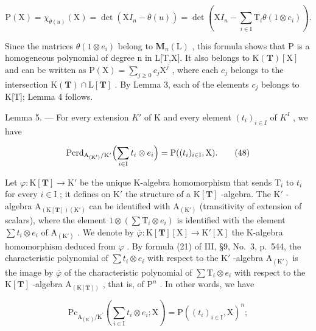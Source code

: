 \[
\mathrm{P} (\mathrm{X}) = \chi_ {\overline {{\theta}} (u)} (\mathrm{X}) = \det (\mathrm{X} I _ {n} - \overline {{\theta}} (u)) = \det \left(\mathrm{X} I _ {n} - \sum_ {i \in \mathrm{I}} \mathrm{T} _ {i} \theta (1 \otimes e _ {i})\right).\tag{47}
\]

Since the matrices \(\theta(1\otimes e_{i})\) belong to \(\mathbf{M}_{n}(\mathrm{L})\) , this formula shows that P is a homogeneous polynomial of degree n in L{[}T,X{]}. It also belongs to \(\mathrm{K}(\mathbf{T})[\mathrm{X}]\) and can be written as \(\mathrm{P}(\mathrm{X})=\sum_{j\geqslant0}c_{j}\mathrm{X}^{j}\) , where each \(c_{j}\) belongs to the intersection \(\mathrm{K}(\mathbf{T})\cap\mathrm{L}[\mathbf{T}]\) . By Lemma 3, each of the elements \(c_{j}\) belongs to K{[}T{]}; Lemma 4 follows.

Lemma 5. --- For every extension \(K'\) of K and every element \((t_{i})_{i\in I}\) of \(K^{I}\) , we have

\[
\mathrm{Pcrd} _ {\mathrm{A} _ {(\mathrm{K} ^ {\prime})} / \mathrm{K} ^ {\prime}} \Bigl (\sum_ {i \in \mathrm{I}} t _ {i} \otimes e _ {i} \Bigr) = \mathrm{P} ((t _ {i}) _ {i \in \mathrm{I}}, \mathrm{X}).\tag{48}
\]

Let \(\varphi : \mathrm{K}[\mathbf{T}] \to \mathrm{K}'\) be the unique K-algebra homomorphism that sends \(\mathrm{T}_i\) to \(t_i\) for every \(i \in \mathrm{I}\) ; it defines on \(\mathrm{K}'\) the structure of a \(\mathrm{K}[\mathbf{T}]\) -algebra. The \(\mathrm{K}'\) -algebra \(\mathrm{A}_{(\mathrm{K}[\mathbf{T}])(\mathrm{K}')}\) can be identified with \(\mathrm{A}_{(\mathrm{K}')}\) (transitivity of extension of scalars), where the element \(1 \otimes (\sum \mathrm{T}_i \otimes e_i)\) is identified with the element \(\sum t_i \otimes e_i\) of \(\mathrm{A}_{(\mathrm{K}')}\) . We denote by \(\overline{\varphi}: \mathrm{K}[\mathbf{T}][\mathrm{X}] \to \mathrm{K}'[\mathrm{X}]\) the K-algebra homomorphism deduced from \(\varphi\) . By formula (21) of III, §9, No.~3, p.~544, the characteristic polynomial of \(\sum t_i \otimes e_i\) with respect to the \(\mathrm{K}'\) -algebra \(\mathrm{A}_{(\mathrm{K}')}\) is the image by \(\overline{\varphi}\) of the characteristic polynomial of \(\sum \mathrm{T}_i \otimes e_i\) with respect to the \(\mathrm{K}[\mathbf{T}]\) -algebra \(\mathrm{A}_{(\mathrm{K}[\mathbf{T}])}\) , that is, of \(\mathrm{P}^n\) . In other words, we have

\[
\mathrm{Pc} _ {\mathrm{A} _ {(\mathrm{K} ^ {\prime})} / \mathrm{K} ^ {\prime}} \left(\sum_ {i \in \mathrm{I}} t _ {i} \otimes e _ {i}; \mathrm{X}\right) = \mathrm{P} ((t _ {i}) _ {i \in \mathrm{I}}, \mathrm{X}) ^ {n};\tag{49}
\]

